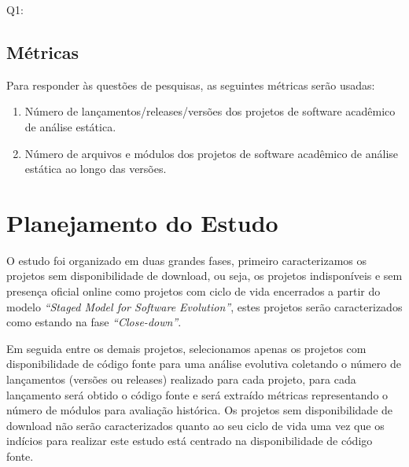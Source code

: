 \begin{description}
  \item [Q1:] \EstudoTresQuestaoUm
\end{description}

\subsection{Métricas}

Para responder às questões de pesquisas, as seguintes métricas serão usadas:

\begin{enumerate}
  \item Número de lançamentos/releases/versões dos projetos de software acadêmico de análise estática.
  \item Número de arquivos e módulos dos projetos de software acadêmico de análise estática ao longo das versões.
\end{enumerate}


\section{Planejamento do Estudo} \label{estudo3:planejamento}

O estudo foi organizado em duas grandes fases, primeiro caracterizamos os
projetos sem disponibilidade de download, ou seja, os projetos indisponíveis e
sem presença oficial online como projetos com ciclo de vida encerrados a partir
do modelo {\it ``Staged Model for Software Evolution''}, estes projetos serão
caracterizados como estando na fase {\it ``Close-down''}.

Em seguida entre os demais projetos, selecionamos apenas os projetos com
disponibilidade de código fonte para uma análise evolutiva coletando o número
de lançamentos (versões ou releases) realizado para cada projeto, para cada
lançamento será obtido o código fonte e será extraído métricas representando o
número de módulos para avaliação histórica. Os projetos sem disponibilidade de
download não serão caracterizados quanto ao seu ciclo de vida uma vez que os
indícios para realizar este estudo está centrado na disponibilidade de código
fonte.


